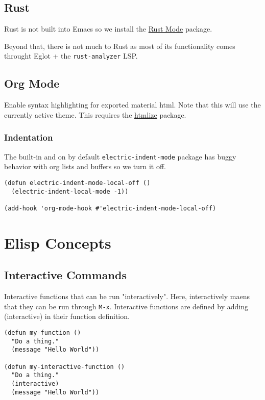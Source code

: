 \documentclass[11pt]{article}
\begin{document}
\subsection{Rust}
\label{sec:org1224eac}

Rust is not built into Emacs so we install the \href{https://github.com/rust-lang/rust-mode/tree/25d91cff281909e9b7cb84e31211c4e7b0480f94}{Rust Mode} package.

Beyond that, there is not much to Rust as most of its functionality comes
throught Eglot + the \texttt{rust-analyzer} LSP.
\subsection{Org Mode}
\label{sec:org9170620}

Enable syntax highlighting for exported material html. Note that this will use
the currently active theme. This requires the \href{https://elpa.nongnu.org/nongnu/htmlize.html}{htmlize} package.
\subsubsection{Indentation}
\label{sec:org1730eba}

The built-in and on by default \texttt{electric-indent-mode} package has buggy behavior
with org lists and buffers so we turn it off.

\begin{verbatim}
(defun electric-indent-mode-local-off ()
  (electric-indent-local-mode -1))

(add-hook 'org-mode-hook #'electric-indent-mode-local-off)
\end{verbatim}
\section{Elisp Concepts}
\label{sec:org786362a}

\subsection{Interactive Commands}
\label{sec:orgaf89e6f}

Interactive functions that can be run "interactively". Here, interactively maens
that they can be run through \texttt{M-x}. Interactive functions are defined by adding
(interactive) in their function definition.

\begin{verbatim}
(defun my-function ()
  "Do a thing."
  (message "Hello World"))

(defun my-interactive-function ()
  "Do a thing."
  (interactive)
  (message "Hello World"))
\end{verbatim}
\end{document}

